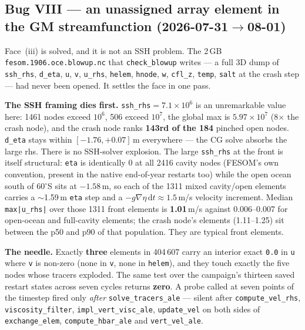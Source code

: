 \documentclass[11pt,a4paper]{article}
\newcommand{\code}[1]{\texttt{\small #1}}
\begin{document}
\subsection{Bug VIII --- an unassigned array element in the GM streamfunction (2026-07-31$\to$08-01)}\label{sec:bug8}

Face~(iii) is solved, and it is not an SSH problem. The 2\,GB \code{fesom.1906.oce.blowup.nc} that
\code{check\_blowup} writes --- a full 3D dump of \code{ssh\_rhs}, \code{d\_eta}, \code{u}, \code{v},
\code{u\_rhs}, \code{helem}, \code{hnode}, \code{w}, \code{cfl\_z}, \code{temp}, \code{salt} at the
crash step --- had never been opened. It settles the face in one pass.

\textbf{The SSH framing dies first.} \code{ssh\_rhs}$=7.1\times10^{6}$ is an unremarkable value here:
1461 nodes exceed $10^{6}$, 506 exceed $10^{7}$, the global max is $5.97\times10^{7}$ (8$\times$ the
crash node), and the crash node ranks \textbf{143rd of the 184} pinched open nodes. \code{d\_eta} stays
within $[-1.76,+0.07]$\,m everywhere --- the CG solve absorbs the large rhs. There is no SSH-solver
explosion. The large \code{ssh\_rhs} at the front is itself structural: \code{eta} is identically 0 at
all 2416 cavity nodes (FESOM's own convention, present in the native end-of-year restarts too) while the
open ocean south of 60$^\circ$S sits at $-1.58$\,m, so each of the 1311 mixed cavity/open elements
carries a $\sim$1.59\,m \code{eta} step and a $-g\nabla\eta\,\mathrm{d}t\approx1.5$\,m/s velocity
increment. Median \code{max|u\_rhs|} over those 1311 front elements is \textbf{1.01}\,m/s against
0.006--0.007 for open-ocean and full-cavity elements; the crash node's elements (1.11--1.25) sit between
the p50 and p90 of that population. They are typical front elements.

\textbf{The needle.} Exactly \textbf{three} elements in 404\,607 carry an interior exact
\code{0.0} in \code{u} where \code{v} is non-zero (none in \code{v}, none in \code{helem}), and they
touch exactly the five nodes whose tracers exploded. The same test over the campaign's thirteen saved
restart states across seven cycles returns \textbf{zero}. A probe called at seven points of the timestep
fired only \emph{after} \code{solve\_tracers\_ale} --- silent after \code{compute\_vel\_rhs},
\code{viscosity\_filter}, \code{impl\_vert\_visc\_ale}, \code{update\_vel} on both sides of
\code{exchange\_elem}, \code{compute\_hbar\_ale} and \code{vert\_vel\_ale}.
\end{document}
